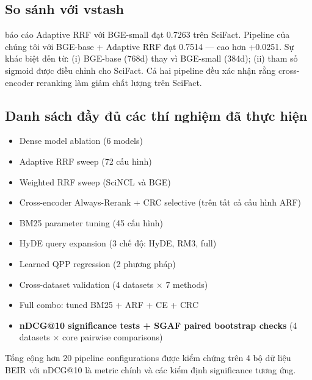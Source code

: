 \subsection{So sánh với vstash}
\citet{steffens2026vstash} báo cáo Adaptive RRF với BGE-small đạt 0.7263 trên SciFact. Pipeline của
chúng tôi với BGE-base + Adaptive RRF đạt 0.7514 --- cao hơn +0.0251. Sự khác biệt đến từ: (i) BGE-base
(768d) thay vì BGE-small (384d); (ii) tham số sigmoid được điều chỉnh cho SciFact. Cả hai pipeline
đều xác nhận rằng cross-encoder reranking làm giảm chất lượng trên SciFact.

\subsection{Danh sách đầy đủ các thí nghiệm đã thực hiện}
\begin{itemize}[leftmargin=1.6em,itemsep=1pt]
  \item Dense model ablation (6 models)
  \item Adaptive RRF sweep (72 cấu hình)
  \item Weighted RRF sweep (SciNCL và BGE)
  \item Cross-encoder Always-Rerank + CRC selective (trên tất cả cấu hình ARF)
  \item BM25 parameter tuning (45 cấu hình)
  \item HyDE query expansion (3 chế độ: HyDE, RM3, full)
  \item Learned QPP regression (2 phương pháp)
  \item Cross-dataset validation (4 datasets $\times$ 7 methods)
  \item Full combo: tuned BM25 + ARF + CE + CRC
  \item \textbf{nDCG@10 significance tests + SGAF paired bootstrap checks} (4 datasets $\times$ core pairwise comparisons)
\end{itemize}
Tổng cộng hơn 20 pipeline configurations được kiểm chứng trên 4 bộ dữ liệu BEIR với nDCG@10 là metric chính và các kiểm định significance tương ứng.
